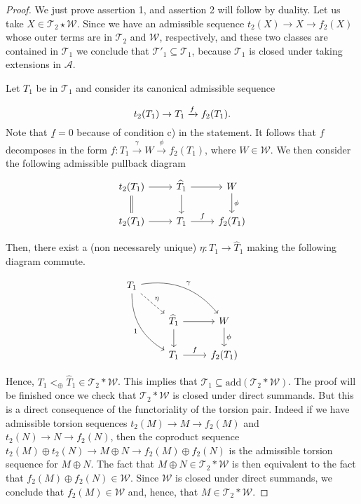 \begin{proof}
We just prove assertion 1, and assertion 2 will follow by duality.
Let us take $X\in\mathcal{T}_2\star\mathcal{W}$. Since we have an
admissible sequence $t_2(X)\longrightarrow X\longrightarrow f_2(X)$
whose outer terms are in $\mathcal{T}_2$ and $\mathcal{W}$,
respectively, and these two classes are contained in $\mathcal{T}_1$ we
conclude that $\mathcal{T}'_1\subseteq\mathcal{T}_1$, because
$\mathcal{T}_1$ is closed under taking extensions in $\mathcal{A}$.



  Let $T_1$ be in $\mathcal{T}_1$ and consider its canonical admissible
sequence

  \begin{equation}
    t_2(T_1)\to T_1\xrightarrow{f} f_2(T_1).
  \end{equation}
    Note that $\underline{f}=0$ because of condition c) in the
statement. It follows that $f$ decomposes  in the form
$f:T_1\stackrel{\gamma}{\longrightarrow}W\stackrel{\phi}{\longrightarrow}f_2(T_1)$,
where $W\in\mathcal{W}$. We then consider the following admissible
pullback diagram
  \begin{equation}
    \begin{tikzcd}
      t_2(T_1)\arrow{r}\arrow[equal]{d} &
        \widehat{T}_1\arrow{r}\arrow{d} &
          W\arrow{d}{\phi}\\
      t_2(T_1)\arrow{r}&
        T_1\arrow{r}{f}&
          f_2(T_1)
    \end{tikzcd}
  \end{equation}


  Then, there exist a (non necessarely unique) $\eta:T_1\to
\widehat{T}_1$ making the following diagram commute.

  \begin{equation}
    \begin{tikzcd}
      T_1\arrow[bend
right]{ddr}[']{1}\arrow[dashed]{dr}{\eta}\arrow[bend left]{rrd}{\gamma}&&\\
      &
        \widehat{T}_1\arrow{r}\arrow{d}&
          W\arrow{d}{\phi}\\
      &
        T_1\arrow{r}{f}&
          f_2(T_1)
    \end{tikzcd}
  \end{equation}

  Hence, $T_1 <_\oplus \widehat{T}_1\in \mathcal{T}_2  \ast
\mathcal{W}$. This implies that  $\mathcal{T}_1\subseteq
\mathrm{add}(\mathcal{T}_2\ast \mathcal{W})$. The proof will be finished
once we check that $\mathcal{T}_2\ast \mathcal{W}$ is closed under
direct summands. But this is a direct consequence of the functoriality
of the torsion pair. Indeed if we have admissible torsion sequences
$t_2(M)\longrightarrow M\longrightarrow f_2(M)$ and
$t_2(N)\longrightarrow N\longrightarrow f_2(N)$, then the coproduct
sequence $t_2(M)\oplus t_2(N)\longrightarrow M\oplus N\longrightarrow
f_2(M)\oplus f_2(N)$ is the admissible torsion sequence for $M\oplus N$.
The fact that $M\oplus N\in\mathcal{T}_2\ast \mathcal{W}$ is then
equivalent to the fact that $f_2(M)\oplus f_2(N)\in\mathcal{W}$. Since
$\mathcal{W}$ is closed under direct summands, we conclude that
$f_2(M)\in\mathcal{W}$ and, hence, that $M\in\mathcal{T}_2\ast\mathcal{W}$.

\end{proof}
